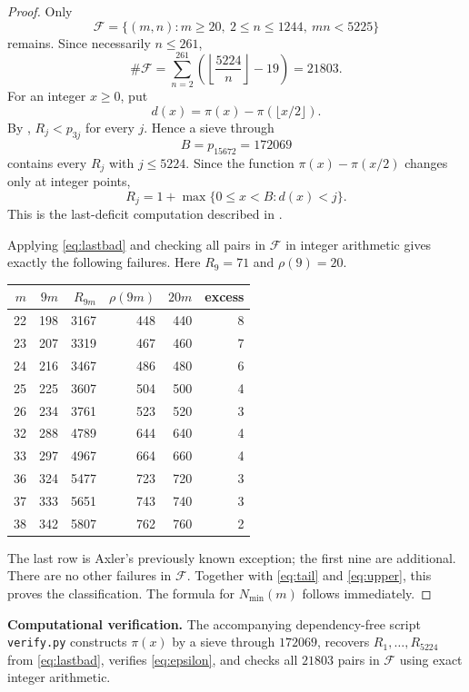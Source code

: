 \documentclass[11pt]{amsart}
\begin{document}
\begin{proof}
Only
\[
 \mathcal F=\{(m,n):m\geq20,\ 2\leq n\leq1244,\ mn<5225\}
\]
remains.  Since necessarily $n\leq261$,
\[
 \#\mathcal F
 =\sum_{n=2}^{261}
   \left(\left\lfloor\frac{5224}{n}\right\rfloor-19\right)
 =21803.
\]
For an integer $x\geq0$, put
\[
 d(x)=\pi(x)-\pi(\lfloor x/2\rfloor).
\]
By \cite[Theorem~3]{SNN}, $R_j<p_{3j}$ for every $j$.  Hence a sieve
through
\[
 B=p_{15672}=172069
\]
contains every $R_j$ with $j\leq5224$.  Since the function
$\pi(x)-\pi(x/2)$ changes only at integer points,
\begin{equation}\label{eq:lastbad}
 R_j=1+\max\{0\leq x<B:d(x)<j\}.
\end{equation}
This is the last-deficit computation described in
\cite[Appendix]{SNN}.

Applying \eqref{eq:lastbad} and checking all pairs in $\mathcal F$ in
integer arithmetic gives exactly the following failures.  Here
$R_9=71$ and $\rho(9)=20$.
\begin{center}
\renewcommand{\arraystretch}{1.05}
\begin{tabular}{@{}rrrrrr@{}}
\toprule
$m$ & $9m$ & $R_{9m}$ & $\rho(9m)$ & $20m$ & excess \\
\midrule
22 & 198 & 3167 & 448 & 440 & 8 \\
23 & 207 & 3319 & 467 & 460 & 7 \\
24 & 216 & 3467 & 486 & 480 & 6 \\
25 & 225 & 3607 & 504 & 500 & 4 \\
26 & 234 & 3761 & 523 & 520 & 3 \\
32 & 288 & 4789 & 644 & 640 & 4 \\
33 & 297 & 4967 & 664 & 660 & 4 \\
36 & 324 & 5477 & 723 & 720 & 3 \\
37 & 333 & 5651 & 743 & 740 & 3 \\
38 & 342 & 5807 & 762 & 760 & 2 \\
\bottomrule
\end{tabular}
\end{center}
The last row is Axler's previously known exception; the first nine are
additional.  There are no other failures in $\mathcal F$.  Together with
\eqref{eq:tail} and \eqref{eq:upper}, this proves the classification.
The formula for $N_{\min}(m)$ follows immediately.
\end{proof}

\noindent\textbf{Computational verification.}
The accompanying dependency-free script \texttt{verify.py} constructs
$\pi(x)$ by a sieve through $172069$, recovers $R_1,\ldots,R_{5224}$
from \eqref{eq:lastbad}, verifies \eqref{eq:epsilon}, and checks all
$21803$ pairs in $\mathcal F$ using exact integer arithmetic.
\end{document}
